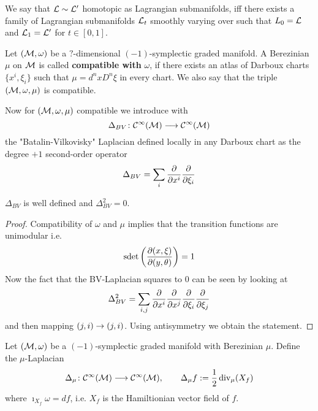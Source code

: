 We say that $\mathcal{L} \sim \mathcal{L}^\prime$ homotopic as Lagrangian submanifolds, iff there exists a family of Lagrangian submanifolds $\mathcal{L}_t$ smoothly varying over  such that $L_0 = \mathcal{L}$ and $\mathcal{L}_1 = \mathcal{L}^\prime$ for $t \in [0,1]$.

\begin{definition}
  Let $(\mathcal{M}, \omega)$ be a $?$-dimensional $(-1)$-symplectic graded manifold. A Berezinian $\mu$ on $\mathcal{M}$ is called \textbf{compatible with} $\omega$, if there exists an atlas of Darboux charts $\{ x^i, \xi_i\}$ such that $\mu = d^nx D^n \xi$ in every chart. We also say that the triple $(\mathcal{M}, \omega, \mu)$ is compatible.
\end{definition}

Now for $(\mathcal{M}, \omega, \mu)$ compatible we introduce with
\begin{equation}
  \Delta_{BV} \colon \mathcal{C}^{\infty}(\mathcal{M}) \longrightarrow \mathcal{C}^{\infty}(\mathcal{M})
\end{equation}
the "Batalin-Vilkovisky" Laplacian defined locally in any Darboux chart as the degree $+1$ second-order operator
\begin{equation}
  \Delta_{BV} = \sum_i \frac{\partial }{\partial x^i} \frac{\partial }{\partial \xi_i}
\end{equation}

\begin{lem}
  $\Delta_{BV}$ is well defined and $\Delta_{BV}^2 = 0$.
\begin{proof}
  Compatibility of $\omega$ and $\mu$ implies that the transition functions are unimodular i.e.
  $$ \operatorname{sdet}\left( \frac{\partial (x, \xi)}{\partial (y, \theta)} \right) = 1 $$
  Now the fact that the BV-Laplacian squares to $0$ can be seen by looking at
  \begin{equation}
    \Delta_{BV}^2 = \sum_{i,j} \frac{\partial }{\partial x^i} \frac{\partial }{\partial x^j} \frac{\partial }{\partial \xi_i} \frac{\partial }{\partial \xi_j}
  \end{equation}
  and then mapping $(j,i) \rightarrow (j,i)$. Using antisymmetry we obtain the statement.
\end{proof}
\end{lem}

\begin{definition}
  Let $(\mathcal{M}, \omega)$ be a $(-1)$-symplectic graded manifold with Berezinian $\mu$. Define the $\mu$-Laplacian
  \begin{equation}
    \Delta_\mu \colon \mathcal{C}^{\infty}(\mathcal{M}) \longrightarrow \mathcal{C}^{\infty}(\mathcal{M}), \quad \quad \Delta_\mu f := \frac{1}{2} \operatorname{div}_\mu(X_f)
  \end{equation}
  where $\imath_{X_f} \omega = df$, i.e. $X_f$ is the Hamiltionian vector field of $f$.
\end{definition}

